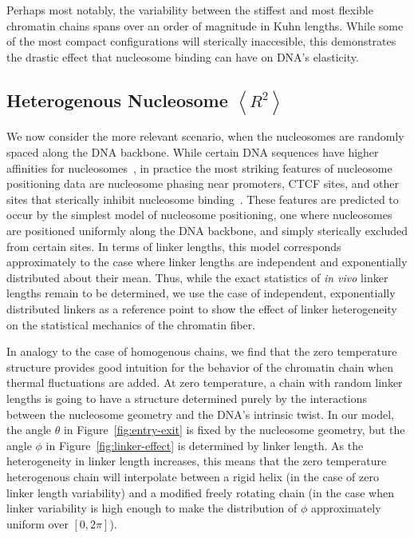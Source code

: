 \documentclass[%
 reprint,
superscriptaddress,
showpacs,preprintnumbers,
 amsmath,amssymb,
 aps,
 prl,
]{revtex4-1}
\newcommand{\RR}{\left\langle{}R^2\right\rangle{}}
\begin{document}
Perhaps most notably, the variability between the stiffest and most flexible
    chromatin chains spans over an order of magnitude in Kuhn lengths.
While some of the most compact configurations will sterically inaccesible, this
    demonstrates the drastic effect that nucleosome binding can have on DNA's
    elasticity.

\subsection{\label{sec:homo-kuhn}Heterogenous Nucleosome $\RR$}

We now consider the more relevant scenario, when the nucleosomes are randomly
    spaced along the DNA backbone.
While certain DNA sequences have higher affinities for
    nucleosomes~\cite{something widom}, in practice the most striking features
    of nucleosome positioning data are nucleosome phasing near promoters, CTCF
    sites, and other sites that sterically inhibit nucleosome
    binding~\cite{widom1992}.
These features are predicted to occur by the simplest model of nucleosome
    positioning, one where nucleosomes are positioned uniformly along the DNA
    backbone, and simply sterically excluded from certain sites.
In terms of linker lengths, this model corresponds approximately to the case
    where linker lengths are independent and exponentially distributed about
    their mean.
Thus, while the exact statistics of \textit{in vivo} linker lengths remain to be
    determined, we use the case of independent, exponentially distributed
    linkers as a reference point to show the effect of linker heterogeneity on
    the statistical mechanics of the chromatin fiber.

In analogy to the case of homogenous chains, we find that the zero temperature
    structure provides good intuition for the behavior of the chromatin chain
    when thermal fluctuations are added.
At zero temperature, a chain with random linker lengths is going to have a
    structure determined purely by the interactions between the nucleosome geometry
    and the DNA's intrinsic twist.
In our model, the angle $\theta$ in Figure~\ref{fig:entry-exit} is fixed by the
    nucleosome geometry, but the angle $\phi$ in Figure~\ref{fig:linker-effect}
    is determined by linker length.
As the heterogeneity in linker length increases, this means that the
    zero temperature heterogenous chain will interpolate between a rigid helix
    (in the case of zero linker length variability) and a modified freely
    rotating chain (in the case when linker variability is high enough to make
    the distribution of $\phi$ approximately uniform over $[0, 2\pi]$).
\end{document}
